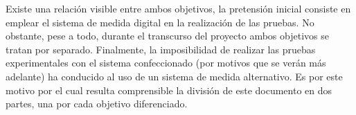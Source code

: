 Existe una relación visible entre ambos objetivos, la pretensión inicial
consiste en emplear el sistema de medida digital en la realización de las
pruebas. No obstante, pese a todo, durante el transcurso del proyecto ambos
objetivos se tratan por separado. Finalmente, la imposibilidad de realizar
las pruebas experimentales con el sistema confeccionado (por motivos que se
verán más adelante) ha conducido al uso de un sistema de medida
alternativo. Es por este motivo por el cual resulta comprensible la
división de este documento en dos partes, una por cada objetivo
diferenciado.


% 
% 
% 
% 
